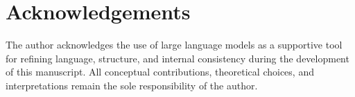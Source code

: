 \documentclass[11pt,a4paper]{article}
\begin{document}
  \section*{Acknowledgements}

  The author acknowledges the use of large language models as a supportive tool
  for refining language, structure, and internal consistency during the development
  of this manuscript.
  All conceptual contributions, theoretical choices, and interpretations remain
  the sole responsibility of the author.

  
  
\end{document}
